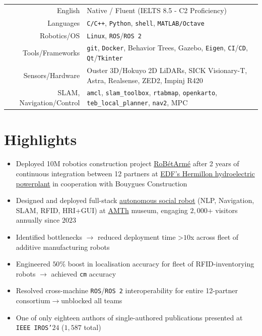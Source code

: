 \documentclass[a4paper,10pt,twoside]{article}
\begin{document}
\begin{center}
\begin{tabular}{rl}
English & Native / Fluent (IELTS 8.5 - C2 Proficiency) \\
Languages & \texttt{C/C++}, \texttt{Python}, \texttt{shell}, \texttt{MATLAB/Octave} \\
Robotics/OS & \texttt{Linux},  \texttt{ROS}/\texttt{ROS 2} \\
Tools/Frameworks & \texttt{git}, \texttt{Docker}, Behavior Trees, Gazebo, \texttt{Eigen}, \texttt{CI}/\texttt{CD}, \texttt{Qt}/\texttt{Tkinter} \\
Sensors/Hardware & {\small Ouster 3D/Hokuyo 2D LiDARs, SICK Visionary-T, Astra, Realsense, ZED2, Impinj R420 }\\
SLAM, Navigation/Control & \texttt{amcl}, \texttt{slam\_toolbox}, \texttt{rtabmap}, \texttt{openkarto}, \texttt{teb\_local\_planner}, \texttt{nav2}, MPC
\end{tabular}
\end{center}
\verticalspacebetweensections

\section{\textbf{Highlights}}\verticalspacebetweensectionandcontent
  \noindent\begin{minipage}[t]{\textwidth}
    \begin{itemize}
      \item Deployed \texteuro10M robotics construction project \href{https://www.robetarme-project.eu/sobre/}{RoBétArmé} after 2 years of continuous integration between 12 partners at \href{https://www.gem.wiki/Hermillon_hydroelectric_plant}{EDF's Hermillon hydroelectric powerplant} in cooperation with Bouygues Construction\verticalspaceafteritem
      \item Designed and deployed full-stack \href{https://www.youtube.com/watch?v=2EvTGNOqTrs}{autonomous social robot} (NLP, Navigation, SLAM, RFID, HRI+GUI) at \href{https://www.amth.gr/en}{AMTh} museum, engaging $2$$,$$000$+ visitors annually since $2023$\verticalspaceafteritem
      \item Identified bottlenecks $\rightarrow$ reduced deployment time >$10$x across fleet of additive manufacturing robots\verticalspaceafteritem
      \item Engineered $50\%$ boost in localisation accuracy for fleet of RFID-inventorying robots $\rightarrow$ achieved \texttt{cm} accuracy\verticalspaceafteritem
      \item Resolved cross-machine \texttt{ROS}/\texttt{ROS~2} interoperability for entire 12-partner consortium$\rightarrow$unblocked all teams\verticalspaceafteritem
      \item One of only eighteen authors of single-authored publications presented at \texttt{IEEE IROS'}$24$ ($1$$,$$587$ total)
    \end{itemize}
  \end{minipage} \\%
\verticalspacebetweensections
\end{document}
